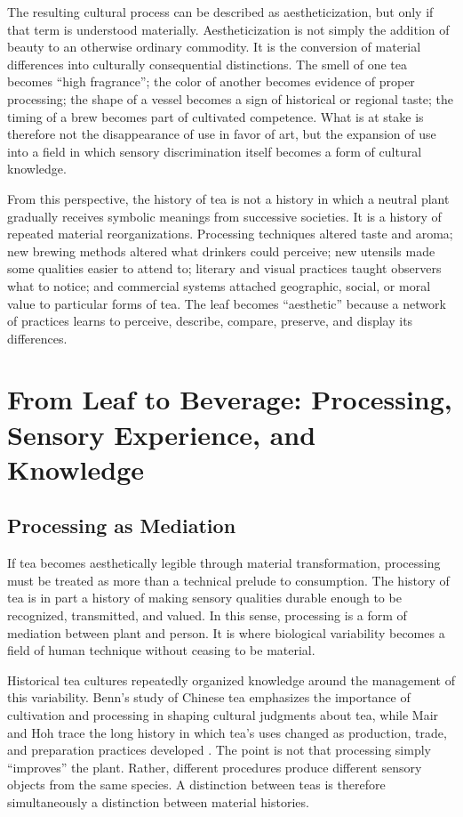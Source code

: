 \documentclass[numbers]{IntechOpen-Book}
\begin{document}
The resulting cultural process can be described as aestheticization, but only if that term is understood materially. Aestheticization is not simply the addition of beauty to an otherwise ordinary commodity. It is the conversion of material differences into culturally consequential distinctions. The smell of one tea becomes ``high fragrance''; the color of another becomes evidence of proper processing; the shape of a vessel becomes a sign of historical or regional taste; the timing of a brew becomes part of cultivated competence. What is at stake is therefore not the disappearance of use in favor of art, but the expansion of use into a field in which sensory discrimination itself becomes a form of cultural knowledge.

From this perspective, the history of tea is not a history in which a neutral plant gradually receives symbolic meanings from successive societies. It is a history of repeated material reorganizations. Processing techniques altered taste and aroma; new brewing methods altered what drinkers could perceive; new utensils made some qualities easier to attend to; literary and visual practices taught observers what to notice; and commercial systems attached geographic, social, or moral value to particular forms of tea. The leaf becomes ``aesthetic'' because a network of practices learns to perceive, describe, compare, preserve, and display its differences.

\section{From Leaf to Beverage: Processing, Sensory Experience, and Knowledge}

\subsection{Processing as Mediation}

If tea becomes aesthetically legible through material transformation, processing must be treated as more than a technical prelude to consumption. The history of tea is in part a history of making sensory qualities durable enough to be recognized, transmitted, and valued. In this sense, processing is a form of mediation between plant and person. It is where biological variability becomes a field of human technique without ceasing to be material.

Historical tea cultures repeatedly organized knowledge around the management of this variability. Benn's study of Chinese tea emphasizes the importance of cultivation and processing in shaping cultural judgments about tea, while Mair and Hoh trace the long history in which tea's uses changed as production, trade, and preparation practices developed \cite{benn,mair}. The point is not that processing simply ``improves'' the plant. Rather, different procedures produce different sensory objects from the same species. A distinction between teas is therefore simultaneously a distinction between material histories.
\end{document}
